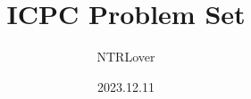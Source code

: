 \documentclass[a4paper]{report}
\begin{document}
\begin{CJK*}{UTF8}{gbsn}

\title{ICPC Problem Set}
\author{NTRLover}
\date{2023.12.11}

\maketitle




\end{CJK*}
\end{document}
